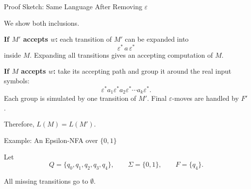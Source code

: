 \documentclass[10pt,aspectratio=169]{beamer}
\newcommand{\eps}{\varepsilon}
\begin{document}
\begin{frame}{Proof Sketch: Same Language After Removing \(\eps\)}

\small
We show both inclusions.

\vspace{0.5em}
\textbf{If \(M'\) accepts \(w\):}
each transition of \(M'\) can be expanded into
\[
\eps^*\, a\, \eps^*
\]
inside \(M\). Expanding all transitions gives an accepting computation of \(M\).

\vspace{0.7em}
\textbf{If \(M\) accepts \(w\):}
take its accepting path and group it around the real input symbols:
\[
\eps^* a_1 \eps^* a_2 \eps^* \cdots a_k \eps^*.
\]
Each group is simulated by one transition of \(M'\). Final \(\eps\)-moves are handled by \(F'\).

\vspace{0.7em}
Therefore, \(L(M)=L(M')\).

\end{frame}

\begin{frame}{Example: An Epsilon-NFA over \(\{0,1\}\)}

Let
\[
Q=\{q_0,q_1,q_2,q_3,q_4\},
\qquad
\Sigma=\{0,1\},
\qquad
F=\{q_4\}.
\]

\begin{center}
\end{center}

\vspace{0.4em}

All missing transitions go to \(\emptyset\).

\end{frame}
\end{document}
